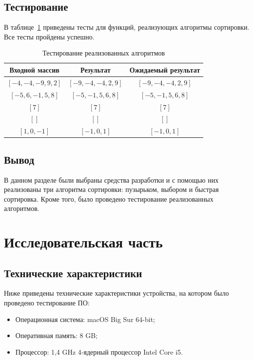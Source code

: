 \documentclass{report}
\begin{document}
\section{Тестирование}

В таблице~\ref{tbl:test} приведены тесты для функций, реализующих алгоритмы сортировки. Все тесты пройдены успешно.

\begin{table}[h!]
	\begin{center}
	\caption{\label{tbl:test}Тестирование реализованных алгоритмов}
		\begin{tabular}{|c|c|c|}
		
			\hline
			Входной массив & Результат & Ожидаемый результат \\ 
			\hline
			$[-4, -4, -9, 9, 2]$ & $[-9, -4, -4, 2, 9]$  & $[-9, -4, -4, 2, 9]$\\\hline
			$[-5, 6, -1, 5, 8]$  & $[-5, -1, 5, 6, 8]$  & $[-5, -1, 5, 6, 8]$\\\hline
			$[7]$  & $[7]$  & $[7]$\\\hline
			$[]$  & $[]$  & $[]$\\\hline
			$[1, 0, -1]$  & $[-1, 0, 1]$  & $[-1, 0, 1]$\\\hline
		\end{tabular}
		
	\end{center}
\end{table}

\section{Вывод}

В данном разделе были выбраны средства разработки и с помощью них реализованы три алгоритма сортировки: пузырьком, выбором и быстрая сортировка. Кроме того, было проведено тестирование реализованных алгоритмов.

\chapter{Исследовательская часть}

\section{Технические характеристики}

Ниже приведены технические характеристики устройства, на котором было проведено тестирование ПО:

\begin{itemize}
	\item Операционная система: macOS Big Sur 64-bit;
	\item Оперативная память: 8 GB;
	\item Процессор: 1,4 GHz 4‑ядерный процессор Intel Core i5.

\end{itemize}
\end{document}
